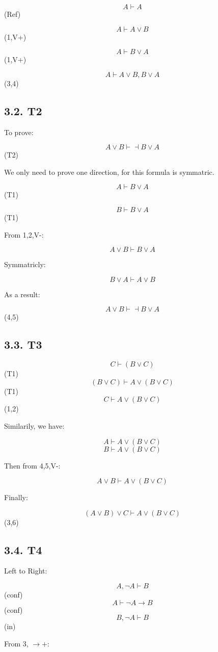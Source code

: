 \documentclass{article} %
\begin{document}
\[A \vdash A\] (Ref)

\[A \vdash A \vee B\] (1,V+)

\[A \vdash B \vee A\] (1,V+)

\[A\vdash A \vee B, B \vee A \] (3,4)

\hypertarget{t2}{%
\subsection{3.2. T2}\label{t2}}

To prove:

\[A\vee B \vdash \dashv B \vee A\] (T2)

We only need to prove one direction, for this formula is symmatric.

\[A \vdash B \vee A\] (T1)

\[B \vdash B \vee A\] (T1)

From 1,2,V-:

\[A \vee B \vdash B \vee A \]

Symmatricly:

\[B \vee A \vdash A \vee B\]

As a result:

\[A\vee B \vdash \dashv B \vee A\] (4,5)

\hypertarget{t3}{%
\subsection{3.3. T3}\label{t3}}

\[C \vdash (B \vee C)\] (T1) \[(B \vee C) \vdash A \vee (B \vee C)\]
(T1) \[C\vdash A \vee (B \vee C)\] (1,2)

Similarily, we have:

\[A\vdash A \vee (B \vee C)\] \[B\vdash A \vee (B \vee C)\]

Then from 4,5,V-:

\[A\vee B \vdash A \vee (B \vee C)\]

Finally:

\[(A \vee B)\vee C \vdash A \vee (B \vee C)\] (3,6)

\hypertarget{t4}{%
\subsection{3.4. T4}\label{t4}}

Left to Right:

\[A ,\neg A \vdash B\] (conf) \[A \vdash \neg A \rightarrow B\] (conf)
\[B ,\neg A \vdash B\] (in)

From 3, \(\rightarrow+\):
\end{document}
